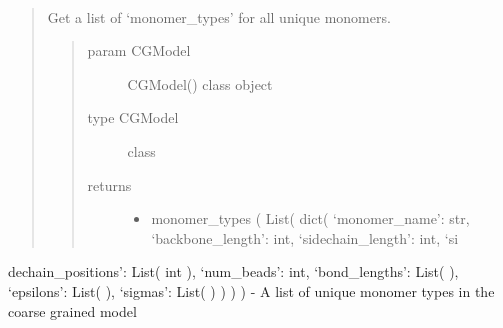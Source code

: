 \documentclass[letterpaper,12pt,english,openany,oneside]{sphinxmanual}
\begin{document}
\begin{fulllineitems}
\begin{fulllineitems}
\begin{quote}
\begin{description}
\begin{itemize}
\end{itemize}


\end{description}\end{quote}

\end{fulllineitems}


\begin{fulllineitems}
\label{\detokenize{cg_model:cg_model.cgmodel.CGModel.get_monomer_types}}~\begin{quote}

Get a list of ‘monomer\_types’ for all unique monomers.
\begin{quote}\begin{description}
\item[{param CGModel}] \leavevmode
CGModel() class object

\item[{type CGModel}] \leavevmode
class

\item[{returns}] \leavevmode\begin{itemize}
\item {} 
monomer\_types ( List( dict( ‘monomer\_name’: str, ‘backbone\_length’: int, ‘sidechain\_length’: int, ‘si

\end{itemize}

\end{description}\end{quote}
\end{quote}

dechain\_positions’: List( int ), ‘num\_beads’: int, ‘bond\_lengths’: List(  ), ‘epsilons’: List(  ), ‘sigmas’: List(  ) ) ) ) - A list of unique monomer types in the coarse grained model

\end{fulllineitems}



\end{fulllineitems}
\end{document}
